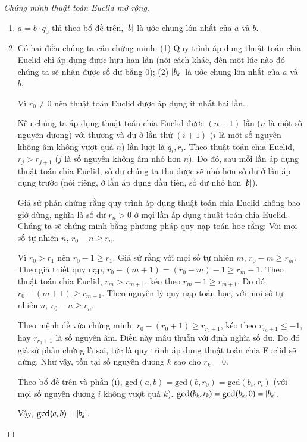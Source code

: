 \begin{proof}[Chứng minh thuật toán Euclid mở rộng]
	\begin{enumerate}[label={(\roman*)}]
		\item $a = b\cdot q_{0}$ thì theo bổ đề trên, $\left\vert{b}\right\vert$ là ước chung lớn nhất của $a$ và $b$.

		\item Có hai điều chúng ta cần chứng minh: (1) Quy trình áp dụng thuật toán chia Euclid chỉ áp dụng được hữu hạn lần (nói cách khác, đến một lúc nào đó chúng ta sẽ nhận được số dư bằng $0$); (2) $\left\vert{b_{k}}\right\vert$ là ước chung lớn nhất của $a$ và $b$.

		      Vì $r_{0}\ne 0$ nên thuật toán Euclid được áp dụng ít nhất hai lần.

		      Nếu chúng ta áp dụng thuật toán chia Euclid được $(n+1)$ lần ($n$ là một số nguyên dương) với thương và dư ở lần thứ $(i+1)$ ($i$ là một số nguyên không âm không vượt quá $n$) lần lượt là $q_{i}, r_{i}$. Theo thuật toán chia Euclid, $r_{j} > r_{j+1}$ ($j$ là số nguyên không âm nhỏ hơn $n$). Do đó, sau mỗi lần áp dụng thuật toán chia Euclid, số dư chúng ta thu được sẽ nhỏ hơn số dư ở lần áp dụng trước (nói riêng, ở lần áp dụng đầu tiên, số dư nhỏ hơn $\left\vert{b}\right\vert$).

		      Giả sử phản chứng rằng quy trình áp dụng thuật toán chia Euclid không bao giờ dừng, nghĩa là số dư $r_{n} > 0$ ở mọi lần áp dụng thuật toán chia Euclid. Chúng ta sẽ chứng minh bằng phương pháp quy nạp toán học rằng: Với mọi số tự nhiên $n$, $r_{0} - n\geq r_{n}$.

		      Vì $r_{0} > r_{1}$ nên $r_{0} - 1\geq r_{1}$. Giả sử rằng với mọi số tự nhiên $m$, $r_{0} - m\geq r_{m}$. Theo giả thiết quy nạp, $r_{0} - (m + 1) = (r_{0} - m) - 1 \geq r_{m} - 1$. Theo thuật toán chia Euclid, $r_{m} > r_{m+1}$, kéo theo $r_{m} - 1\geq r_{m+1}$. Do đó $r_{0} - (m + 1)\geq r_{m+1}$. Theo nguyên lý quy nạp toán học, với mọi số tự nhiên $n$, $r_{0} - n\geq r_{n}$.

		      Theo mệnh đề vừa chứng minh, $r_{0} - (r_{0} + 1)\geq r_{r_{0} + 1}$, kéo theo $r_{r_{0} + 1}\leq -1$, hay $r_{r_{0} + 1}$ là số nguyên âm. Điều này mâu thuẫn với định nghĩa số dư. Do đó giả sử phản chứng là sai, tức là quy trình áp dụng thuật toán chia Euclid sẽ dừng. Như vậy, tồn tại số nguyên dương $k$ sao cho $r_{k} = 0$.

		      Theo bổ đề trên và phần (i), $\text{gcd}(a, b) = \text{gcd}(b, r_{0}) = \text{gcd}(b_{i}, r_{i})$ (với mọi số nguyên dương $i$ không vượt quá $k$). $\text{gcd}(b_{k}, r_{k}) = \text{gcd}(b_{k}, 0) = \left\vert{b_{k}}\right\vert$.

		      Vậy, $\text{gcd}(a, b) = \left\vert{b_{k}}\right\vert$.
	\end{enumerate}
\end{proof}

